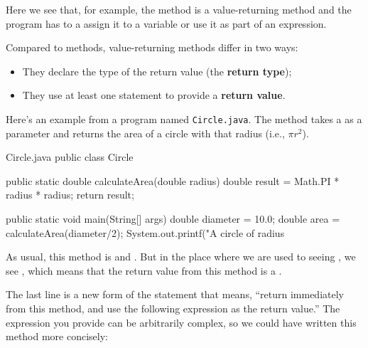 Here we see that, for example, the method  is a value-returning method and the program has to a assign it to a variable or use it as part of an expression.


Compared to  methods, value-returning methods differ in two ways:


\begin{itemize}

\item They declare the type of the return value (the {\bf return type});

\item They use at least one  statement to provide a {\bf return value}.

\end{itemize}


Here's an example from a program named {\tt Circle.java}.
The  method takes a  as a parameter and returns the area of a circle with that radius (i.e., $\pi r^2$).


\begin{trinket} [270] {Circle.java}
public class Circle {

    public static double calculateArea(double radius) {
        double result = Math.PI * radius * radius;
        return result;
    }

    public static void main(String[] args) {
       double diameter = 10.0;
       double area = calculateArea(diameter/2);
       System.out.printf("A circle of radius %
    }
}
\end{trinket}

As usual, this method is  and .
But in the place where we are used to seeing , we see , which means that the return value from this method is a .


The last line is a new form of the  statement that means, ``return immediately from this method, and use the following expression as the return value.''
The expression you provide can be arbitrarily complex, so we could have written this method more concisely:

